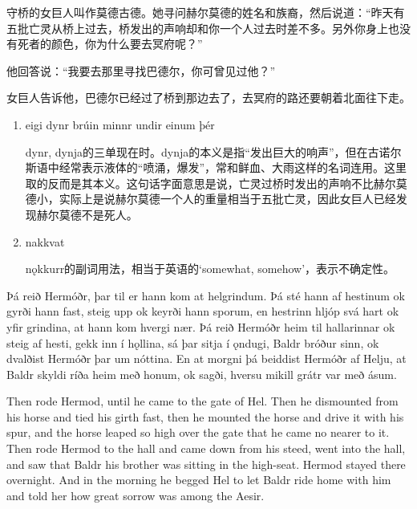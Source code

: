 \begin{translation*}{}
  守桥的女巨人叫作莫德古德。她寻问赫尔莫德的姓名和族裔，然后说道：“昨天有五批亡灵从桥上过去，桥发出的声响却和你一个人过去时差不多。另外你身上也没有死者的颜色，你为什么要去冥府呢？”

  他回答说：“我要去那里寻找巴德尔，你可曾见过他？”

  女巨人告诉他，巴德尔已经过了桥到那边去了，去冥府的路还要朝着北面往下走。
\end{translation*}
\begin{grammar*}{}
  \begin{enumerate}[leftmargin=*]
    \item eigi dynr brúin minnr undir einum þér

          dynr, dynja的三单现在时。dynja的本义是指“发出巨大的响声”，但在古诺尔斯语中经常表示液体的“喷涌，爆发”，常和鲜血、大雨这样的名词连用。这里取的反而是其本义。这句话字面意思是说，亡灵过桥时发出的声响不比赫尔莫德小，实际上是说赫尔莫德一个人的重量相当于五批亡灵，因此女巨人已经发现赫尔莫德不是死人。

    \item nakkvat

          nǫkkurr的副词用法，相当于英语的`somewhat, somehow'，表示不确定性。
  \end{enumerate}
\end{grammar*}
\begin{paracol}{2}
  Þá reið Hermóðr, þar til er hann kom at helgrindum. Þá sté hann af hestinum ok gyrði hann fast, steig upp ok keyrði hann sporum, en hestrinn hljóp svá hart ok yfir grindina, at hann kom hvergi nær. Þá reið Hermóðr heim til hallarinnar ok steig af hesti, gekk inn í hǫllina, sá þar sitja í ǫndugi, Baldr bróður sinn, ok dvalðist Hermóðr þar um nóttina. En at morgni þá beiddist Hermóðr af Helju, at Baldr skyldi ríða heim með honum, ok sagði, hversu mikill grátr var með ásum.

  \switchcolumn

  Then rode Hermod, until he came to the gate of Hel. Then he dismounted from his horse and tied his girth fast, then he mounted the horse and drive it with his spur, and the horse leaped so high over the gate that he came no nearer to it. Then rode Hermod to the hall and came down from his steed, went into the hall, and saw that Baldr his brother was sitting in the high-seat. Hermod stayed there overnight. And in the morning he begged Hel to let Baldr ride home with him and told her how great sorrow was among the Aesir.
\end{paracol}
